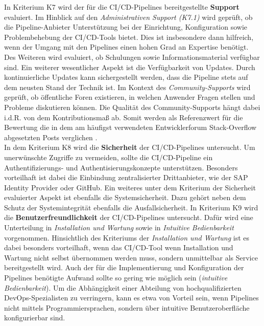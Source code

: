 In Kriterium K7 wird der für die CI/CD-Pipelines bereitgestellte \textbf{Support} evaluiert.  Im Hinblick auf den \textit{Administrativen Support (K7.1)} wird geprüft, ob die Pipeline-Anbieter Unterstützung bei der Einrichtung, Konfiguration sowie Problembehebung der CI/CD-Tools bietet. Dies ist insbesondere dann hilfreich, wenn der Umgang mit den Pipelines einen hohen Grad an Expertise benötigt. Des Weiteren wird evaluiert, ob Schulungen sowie Informationsmaterial verfügbar sind. Ein weiterer wesentlicher Aspekt ist die Verfügbarkeit von Updates. Durch kontinuierliche Updates kann sichergestellt werden, dass die Pipeline stets auf dem neusten Stand der Technik ist. Im Kontext des \textit{Community-Supports} wird geprüft, ob öffentliche Foren existieren, in welchen Anwender Fragen stellen und Probleme diskutieren können. Die Qualität des Community-Supports hängt dabei i.d.R. von dem Kontributionsmaß ab. Somit werden als Referenzwert für die Bewertung die in dem am häufigst verwendeten Entwicklerforum Stack-Overflow abgesetzten Posts verglichen \cite{StackOverflow.20230403}.\\
In dem Kriterium K8 wird die \textbf{Sicherheit} der CI/CD-Pipelines untersucht. Um unerwünschte Zugriffe zu vermeiden, sollte die CI/CD-Pipeline ein Authentifizierungs- und Authentisierungskonzepte unterstützen. Besonders vorteilhaft ist dabei die Einbindung zentralisierter Drittanbieter, wie der SAP Identity Provider oder GitHub. Ein weiteres unter dem Kriterium der Sicherheit evaluierter Aspekt ist ebenfalls die Systemsicherheit. Dazu gehört neben dem Schutz der Systemintegrität ebenfalls die Ausfallsicherheit. 
In Kriterium K9 wird die \textbf{Benutzerfreundlichkeit} der CI/CD-Pipelines untersucht. Dafür wird eine Unterteilung in \textit{Installation und Wartung} sowie in \textit{Intuitive Bedienbarkeit} vorgenommen. Hinsichtlich des Kriteriums der \textit{Installation und Wartung} ist es dabei besonders vorteilhaft, wenn das CI/CD-Tool wenn Installation und Wartung nicht selbst übernommen werden muss, sondern unmittelbar als Service bereitgestellt wird. Auch der für die Implementierung und Konfiguration der Pipelines benötigte Aufwand sollte so gering wie möglich sein (\textit{intuitive Bedienbarkeit}). Um die Abhängigkeit einer Abteilung von hochqualifizierten DevOps-Spezialisten zu verringern, kann es etwa von Vorteil sein, wenn Pipelines nicht mittels Programmiersprachen, sondern über intuitive Benutzeroberfläche konfigurierbar sind. 
